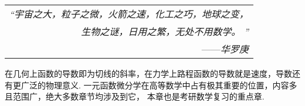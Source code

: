 \begin{flushright}
    \begin{tabular}{r|}
        \textit{“宇宙之大，粒子之微，火箭之速，化工之巧，地球之变，}\\
        \textit{生物之谜，日用之繁，无处不用数学。 ”}\\
        ——\textit{华罗庚}
    \end{tabular}
\end{flushright}

在几何上函数的导数即为切线的斜率，在力学上路程函数的导数就是速度，导数还有更广泛的物理意义.
一元函数微分学在高等数学中占有极其重要的位置，内容多且范围广，绝大多数章节均涉及到它，
本章也是考研数学复习的重点章.
